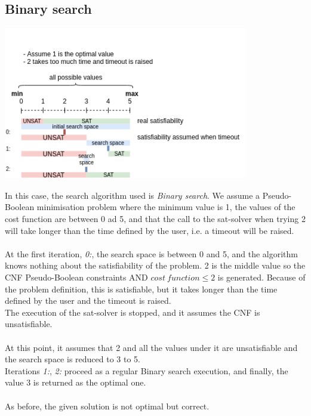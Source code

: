 \subsection{Binary search}
\begin{center}
	\includegraphics[width=0.8\textwidth]{Figures/SimpleTimeoutBinarySearch.png}
	\label{SimpleTimeoutBinarySearch}
\end{center}
In this case, the search algorithm used is \emph{Binary search}. We assume a Pseudo-Boolean minimisation problem where the minimum value is 1, the values of the cost function are between 0 ad 5, and that the call to the sat-solver when trying 2 will take longer than the time defined by the user, i.e. a timeout will be raised.\\\\
At the first iteration, \emph{0:}, the search space is between 0 and 5, and the algorithm knows nothing about the satisfiability of the problem. 2 is the middle value so the CNF Pseudo-Boolean constraints AND $cost \ function \leq 2$ is generated. Because of the problem definition, this is satisfiable, but it takes longer than the time defined by the user and the timeout is raised.\\
The execution of the sat-solver is stopped, and it assumes the CNF is unsatisfiable.\\\\
At this point, it assumes that 2 and all the values under it are unsatisfiable and the search space is reduced to 3 to 5.\\
Iterations \emph{1:}, \emph{2:} proceed as a regular Binary search execution, and finally, the value 3 is returned as the optimal one.\\\\
As before, the given solution is not optimal but correct.

